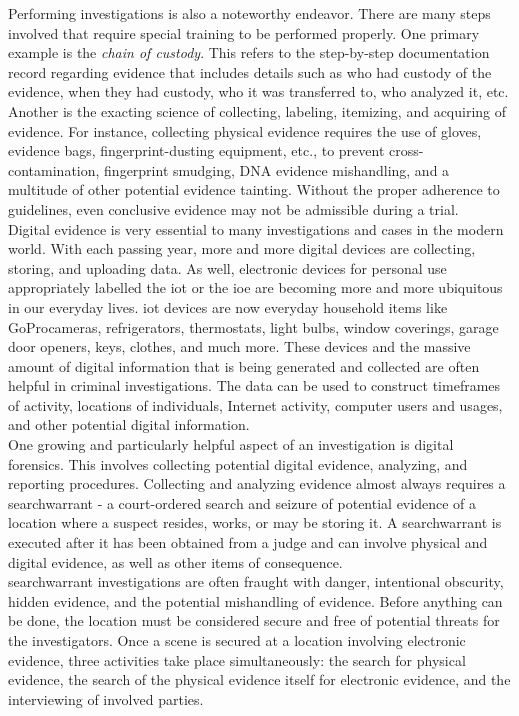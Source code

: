 \documentclass[12pt]{article}
\begin{document}
Performing investigations is also a noteworthy endeavor.  There are many steps involved that require special
training to be performed properly.  One primary example is the {\em chain of custody}.  This refers to the 
step-by-step documentation record regarding evidence that includes details such as who had custody of
the evidence, when they had custody, who it was transferred to, who analyzed it, etc. Another is the exacting
science of collecting, labeling, itemizing, and acquiring of evidence.
For instance, collecting physical evidence requires the use of gloves,
evidence bags, fingerprint-dusting equipment, etc., to prevent
cross-contamination, fingerprint smudging, DNA evidence mishandling,
and a multitude of other potential evidence tainting.  Without the
proper adherence to guidelines, even conclusive evidence may not be
admissible during a trial.\\

Digital evidence is very essential to many investigations and cases in the modern world.
With each passing year, more and more digital devices are collecting, storing, and uploading data.  As
well, electronic devices for personal use appropriately labelled the \gls{iot} or
the \gls{ioe} are becoming more and more
ubiquitous in our everyday lives.  \gls{iot} devices are now everyday household items like GoPro\texttrademark cameras,
refrigerators, thermostats, light bulbs, window coverings, garage door openers, keys, clothes, and much more.
These devices and the massive amount of digital information that
is being generated and collected are often helpful in criminal investigations.  The data can be used to
construct timeframes of activity, locations of individuals, Internet activity, computer users and usages,
and other potential digital information.\\

One growing and particularly helpful aspect of an investigation is digital forensics.
This involves collecting potential digital evidence, analyzing, and reporting procedures.
Collecting and analyzing evidence almost always requires a \gls{searchwarrant} - a court-ordered search and
seizure of potential evidence of a location where a suspect resides, works, or may be storing it.
A \gls{searchwarrant} is executed after it has been obtained from a judge and can involve physical and
digital evidence, as well as other items of consequence.\\

\Gls{searchwarrant} investigations are often fraught with danger, intentional obscurity, hidden evidence, and
the potential mishandling of evidence.  Before anything can be done, the location must be considered
secure and free of potential threats for the investigators.  Once a scene is
secured at a location involving electronic evidence, three activities
take place simultaneously: the search for physical evidence, the search of the physical evidence
itself for electronic evidence, and the interviewing of involved parties.\\
\end{document}
